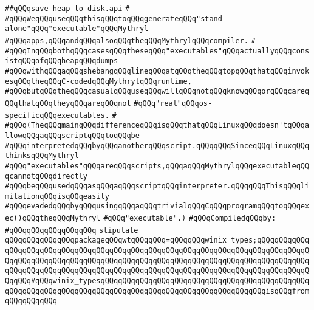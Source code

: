 \label{src/lib/std/src/nj/save-heap-to-disk.api}
\verb|##qQQqsave-heap-to-disk.api|\newline
\verb|#|\newline
\verb|#qQQqWeqQQquseqQQqthisqQQqtoqQQqgenerateqQQq"stand-alone"qQQq"executable"qQQqMythryl|\newline
\verb|#qQQqapps,qQQqandqQQqalsoqQQqtheqQQqMythrylqQQqcompiler.|\newline
\verb|#|\newline
\verb|#qQQqInqQQqbothqQQqcasesqQQqtheseqQQq"executables"qQQqactuallyqQQqconsistqQQqofqQQqheapqQQqdumps|\newline
\verb|#qQQqwithqQQqaqQQqshebangqQQqlineqQQqatqQQqtheqQQqtopqQQqthatqQQqinvokesqQQqtheqQQqC-codedqQQqMythrylqQQqruntime,|\newline
\verb|#qQQqbutqQQqtheqQQqcasualqQQquseqQQqwillqQQqnotqQQqknowqQQqorqQQqcareqQQqthatqQQqtheyqQQqareqQQqnot|\newline
\verb|#qQQq"real"qQQqos-specificqQQqexecutables.|\newline
\verb|#|\newline
\verb|#qQQq(TheqQQqmainqQQqdifferenceqQQqisqQQqthatqQQqLinuxqQQqdoesn'tqQQqallowqQQqaqQQqscriptqQQqtoqQQqbe|\newline
\verb|#qQQqinterpretedqQQqbyqQQqanotherqQQqscript.qQQqqQQqSinceqQQqLinuxqQQqthinksqQQqMythryl|\newline
\verb|#qQQq"executables"qQQqareqQQqscripts,qQQqaqQQqMythrylqQQqexecutableqQQqcannotqQQqdirectly|\newline
\verb|#qQQqbeqQQqusedqQQqasqQQqaqQQqscriptqQQqinterpreter.qQQqqQQqThisqQQqlimitationqQQqisqQQqeasily|\newline
\verb|#qQQqevadedqQQqbyqQQqusingqQQqaqQQqtrivialqQQqCqQQqprogramqQQqtoqQQqexec()qQQqtheqQQqMythryl|\newline
\verb|#qQQq"executable".)|\newline
\newline
\verb|#qQQqCompiledqQQqby:|\newline
\verb|#qQQqqQQqqQQqqQQqqQQq|\newline
\newline
\newline
\verb|stipulate|\newline
\verb|qQQqqQQqqQQqqQQqpackageqQQqwtqQQqqQQq=qQQqqQQqwinix_types;qQQqqQQqqQQqqQQqqQQqqQQqqQQqqQQqqQQqqQQqqQQqqQQqqQQqqQQqqQQqqQQqqQQqqQQqqQQqqQQqqQQqqQQqqQQqqQQqqQQqqQQqqQQqqQQqqQQqqQQqqQQqqQQqqQQqqQQqqQQqqQQqqQQqqQQqqQQqqQQqqQQqqQQqqQQqqQQqqQQqqQQqqQQqqQQqqQQqqQQqqQQqqQQqqQQqqQQqqQQqqQQqqQQq#qQQqwinix_typesqQQqqQQqqQQqqQQqqQQqqQQqqQQqqQQqqQQqqQQqqQQqqQQqqQQqqQQqqQQqqQQqqQQqqQQqqQQqqQQqqQQqqQQqqQQqqQQqqQQqqQQqqQQqisqQQqfromqQQqqQQqqQQq|\newline
